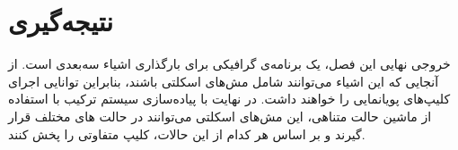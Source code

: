 \section{نتیجه‌گیری}

خروجی نهایی این فصل، یک برنامه‌‌ی گرافیکی برای بارگذاری اشیاء سه‌بعدی است.
از آنجایی که این اشیاء می‌‌توانند شامل مش‌های اسکلتی باشند، بنابراین توانایی اجرای 
کلیپ‌های پویانمایی را خواهند داشت. در نهایت با پیاده‌سازی سیستم ترکیب با استفاده از 
ماشین حالت متناهی، این مش‌های اسکلتی می‌توانند در حالت های مختلف قرار گیرند 
و بر اساس هر کدام از این حالات، کلیپ متفاوتی را پخش کنند.
